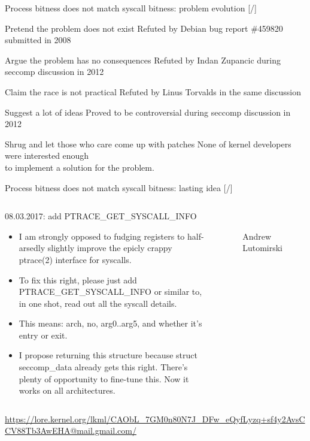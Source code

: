 \documentclass[unicode,aspectratio=169,xcolor={table,dvipsnames,usernames}]{beamer}
\begin{document}
\begin{frame}{Process bitness does not match syscall bitness: problem evolution \hfill [\insertframenumber/\inserttotalframenumber]}
\large
\begin{block}{Pretend the problem does not exist}
Refuted by Debian bug report \#459820 submitted in 2008
\end{block}
\begin{block}{Argue the problem has no consequences}
Refuted by Indan Zupancic during seccomp discussion in 2012
\end{block}
\begin{block}{Claim the race is not practical}
Refuted by Linus Torvalds in the same discussion
\end{block}
\begin{block}{Suggest a lot of ideas}
Proved to be controversial during seccomp discussion in 2012
\end{block}
\begin{block}{Shrug and let those who care come up with patches}
None of kernel developers were interested enough \\
to implement a solution for the problem.
\end{block}
\end{frame}

\begin{frame}{Process bitness does not match syscall bitness: lasting idea \hfill [\insertframenumber/\inserttotalframenumber]}
\Large
\begin{columns}
	\column{11cm}
		\begin{block}{08.03.2017: add PTRACE\_GET\_SYSCALL\_INFO}
		\large
		\begin{itemize}
			\item I am strongly opposed to fudging registers to half-arsedly
			slightly improve the epicly crappy ptrace(2) interface for syscalls.

			\item To fix this right, please just add PTRACE\_GET\_SYSCALL\_INFO or similar
			to, in one shot, read out all the syscall details.

			\item This means: arch, no, arg0..arg5, and whether it's entry or exit.

			\item I propose returning this structure because struct seccomp\_data already gets this right.
			There's plenty of opportunity to fine-tune this.
			Now it works on all architectures.
		\end{itemize}
		\end{block}
	\column{2.5cm}
		\begin{figure}
			\centering
			 \\
			Andrew \\ Lutomirski
		\end{figure}
\end{columns}
\bigskip
\tiny
\url{https://lore.kernel.org/lkml/CAObL_7GM0n80N7J_DFw_eQyfLyzq+sf4y2AvsCCV88Tb3AwEHA@mail.gmail.com/}
\end{frame}
\end{document}
